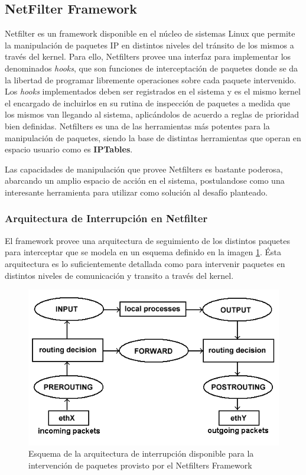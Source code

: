 \subsection{NetFilter Framework}
Netfilter es un framework disponible en el núcleo de sistemas Linux que permite la manipulación de paquetes IP en distintos niveles del tránsito de los mismos a través del kernel. Para ello, Netfilters provee una interfaz para implementar los denominados \emph{hooks}, que son funciones de interceptación de paquetes donde se da la libertad de programar libremente operaciones sobre cada paquete intervenido. Los \emph{hooks} implementados deben ser registrados en el sistema y es el mismo kernel el encargado de incluirlos en su rutina de inspección de paquetes a medida que los mismos van llegando al sistema, aplicándolos de acuerdo a reglas de prioridad bien definidas. Netfilters es una de las herramientas más potentes para la manipulación de paquetes, siendo la base de distintas herramientas que operan en espacio usuario como es \textbf{IPTables}.

Las capacidades de manipulación que provee Netfilters es bastante poderosa, abarcando un amplio espacio de acción en el sistema, postulandose como una interesante herramienta para utilizar como solución al desafío planteado.

\subsubsection{Arquitectura de Interrupción en Netfilter}
El framework provee una arquitectura de seguimiento de los distintos paquetes para interceptar que se modela en un esquema definido en la imagen \ref{netfilterArchitecture}. Ésta arquitectura es lo suficientemente detallada como para intervenir paquetes en distintos niveles de comunicación y transito a través del kernel.

\begin{figure}[!h]
	\centering
	\includegraphics[scale=.5]{imagenes/netfilterArchitecture}
	\caption{Esquema de la arquitectura de interrupción disponible para la intervención de paquetes provisto por el Netfilters Framework}
	\label{netfilterArchitecture}
\end{figure}


